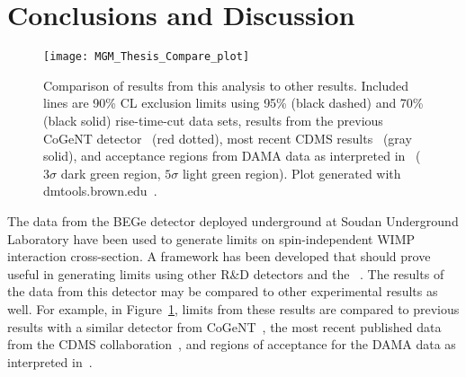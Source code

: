 	\section{Conclusions and Discussion}
	\label{sec:LowMassWIMPConclusions}


		\begin{figure}
			\centering
			\texttt{[image: MGM\_Thesis\_Compare\_plot]}
			\caption[Comparison of exclusions to CDMS, DAMA, and previous CoGeNT results.]
			{Comparison of results from this analysis to other results.  Included lines are 90\% CL 
			exclusion limits using 95\% (black dashed) and 70\% (black solid) rise-time-cut data sets, 
			results from the previous CoGeNT detector~\cite{Aalseth:2008aa} (red dotted), 
			most recent CDMS results~\cite{Ahmed:2009zw} (gray solid), and acceptance regions
			from DAMA data as interpreted in~\cite{Savage:2008er} ($3\sigma$ dark green region,
			$5\sigma$ light green region).  Plot generated with dmtools.brown.edu~\cite{Gai03}.}
			\label{fig:BeGeLimitsComparedToOtherDataSets}
		\end{figure}		

The data from the BEGe detector deployed underground at Soudan Underground Laboratory have been used to generate limits on spin-independent WIMP interaction cross-section.  A framework has been developed that should prove useful in generating limits using other R\&D detectors and the \MJ~\minmod.  The results of the data from this detector may be compared to other experimental results as well.  For example, in Figure~\ref{fig:BeGeLimitsComparedToOtherDataSets}, limits from these results are compared to previous results with a similar detector from CoGeNT~\cite{Aalseth:2008aa}, the most recent published data from the CDMS collaboration~\cite{Ahmed:2009zw}, and regions of acceptance for the DAMA data as interpreted in~\cite{Savage:2008er}.  

